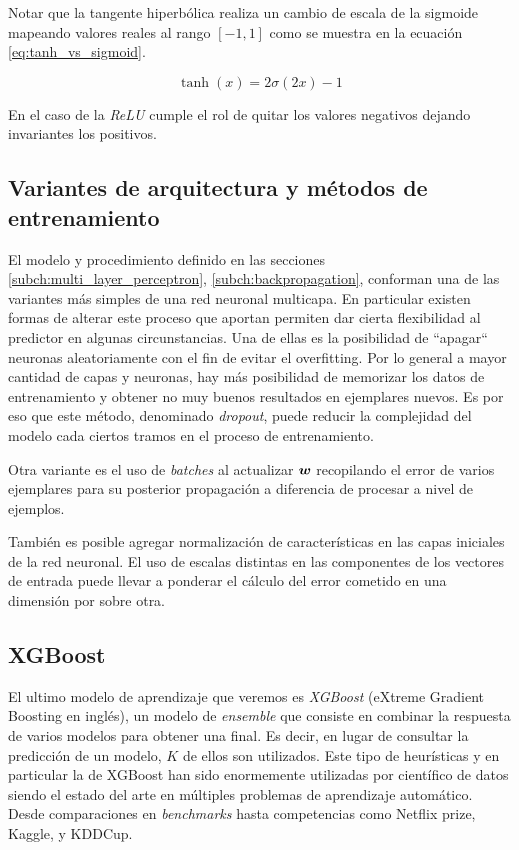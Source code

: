 Notar que la tangente hiperbólica realiza un cambio de escala de la sigmoide
mapeando valores reales al rango $[-1, 1]$ como se muestra en la ecuación \ref{eq:tanh_vs_sigmoid}.

\begin{equation} \label{eq:tanh_vs_sigmoid}
    \tanh\left( x \right) = 2 \sigma(2x) - 1
\end{equation}

En el caso de la \emph{ReLU} cumple el rol de quitar los valores negativos
dejando invariantes los positivos.

\subsection{Variantes de arquitectura y métodos de entrenamiento}

El modelo y procedimiento definido en las secciones \ref{subch:multi_layer_perceptron}, \ref{subch:backpropagation}, conforman una de las
variantes más simples de una red neuronal multicapa. En particular existen
formas de alterar este proceso que aportan permiten dar cierta flexibilidad al
predictor en algunas circunstancias. Una de ellas es la posibilidad de
``apagar`` neuronas aleatoriamente con el fin de evitar el overfitting. Por lo
general a mayor cantidad de capas y neuronas, hay más posibilidad de memorizar los datos de
entrenamiento y obtener no muy buenos resultados en ejemplares nuevos. Es por
eso que este método, denominado \emph{dropout}, puede reducir la complejidad del modelo cada ciertos tramos en el proceso de entrenamiento.

Otra variante es el uso de \emph{batches} al actualizar $\boldsymbol{w}$ recopilando el error de varios ejemplares para su posterior propagación a diferencia de procesar a nivel de ejemplos.

También es posible agregar normalización de características en las capas
iniciales de la red neuronal. El uso de escalas distintas en las componentes de
los vectores de entrada puede llevar a ponderar el cálculo del error cometido en una dimensión por sobre otra.

\subsection{XGBoost}

El ultimo modelo de aprendizaje que veremos es \emph{XGBoost} (eXtreme Gradient
Boosting en inglés), un modelo de \emph{ensemble} que consiste en combinar la
respuesta de varios modelos para obtener una final. Es decir, en lugar de
consultar la predicción de un modelo, $K$ de ellos son utilizados. Este tipo de
heurísticas y en particular la de XGBoost han sido enormemente utilizadas por
científico de datos siendo el estado del arte en múltiples problemas de
aprendizaje automático. Desde comparaciones en \emph{benchmarks} hasta
competencias como Netflix prize, Kaggle, y KDDCup.

